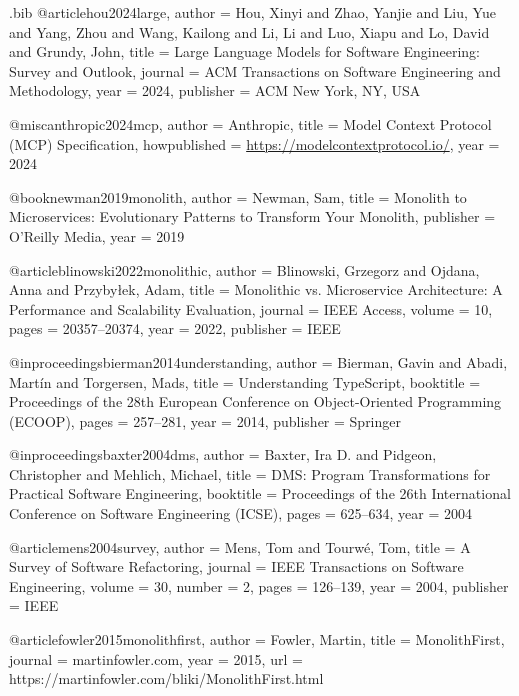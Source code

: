 \begin{filecontents*}{\jobname.bib}
@article{hou2024large,
  author    = {Hou, Xinyi and Zhao, Yanjie and Liu, Yue and Yang, Zhou and Wang, Kailong and Li, Li and Luo, Xiapu and Lo, David and Grundy, John},
  title     = {Large Language Models for Software Engineering: Survey and Outlook},
  journal   = {ACM Transactions on Software Engineering and Methodology},
  year      = {2024},
  publisher = {ACM New York, NY, USA}
}

@misc{anthropic2024mcp,
  author       = {{Anthropic}},
  title        = {Model Context Protocol ({MCP}) Specification},
  howpublished = {\url{https://modelcontextprotocol.io/}},
  year         = {2024}
}

@book{newman2019monolith,
  author    = {Newman, Sam},
  title     = {Monolith to Microservices: Evolutionary Patterns to Transform Your Monolith},
  publisher = {O'Reilly Media},
  year      = {2019}
}

@article{blinowski2022monolithic,
  author    = {Blinowski, Grzegorz and Ojdana, Anna and Przyby{\l}ek, Adam},
  title     = {Monolithic vs. Microservice Architecture: A Performance and Scalability Evaluation},
  journal   = {IEEE Access},
  volume    = {10},
  pages     = {20357--20374},
  year      = {2022},
  publisher = {IEEE}
}

@inproceedings{bierman2014understanding,
  author    = {Bierman, Gavin and Abadi, Mart{\'i}n and Torgersen, Mads},
  title     = {Understanding TypeScript},
  booktitle = {Proceedings of the 28th European Conference on Object-Oriented Programming (ECOOP)},
  pages     = {257--281},
  year      = {2014},
  publisher = {Springer}
}

@inproceedings{baxter2004dms,
  author    = {Baxter, Ira D. and Pidgeon, Christopher and Mehlich, Michael},
  title     = {DMS: Program Transformations for Practical Software Engineering},
  booktitle = {Proceedings of the 26th International Conference on Software Engineering (ICSE)},
  pages     = {625--634},
  year      = {2004}
}

@article{mens2004survey,
  author    = {Mens, Tom and Tourw{\'e}, Tom},
  title     = {A Survey of Software Refactoring},
  journal   = {IEEE Transactions on Software Engineering},
  volume    = {30},
  number    = {2},
  pages     = {126--139},
  year      = {2004},
  publisher = {IEEE}
}

@article{fowler2015monolithfirst,
  author  = {Fowler, Martin},
  title   = {MonolithFirst},
  journal = {martinfowler.com},
  year    = {2015},
  url     = {https://martinfowler.com/bliki/MonolithFirst.html}
}
\end{filecontents*}

